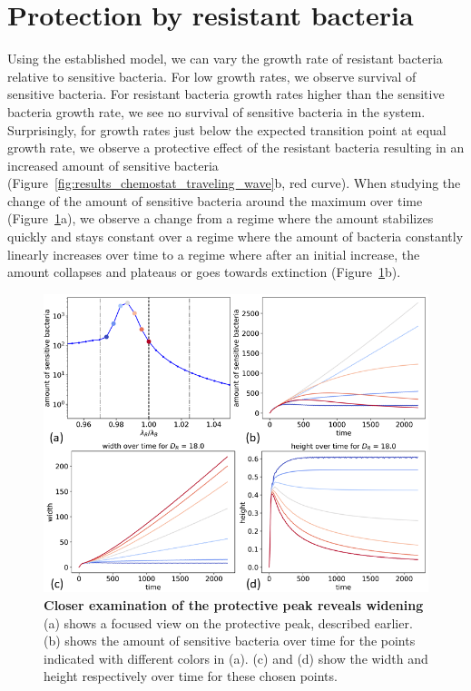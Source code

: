\section{Protection by resistant bacteria}
\label{sec:protective_effect}
Using the established model, we can vary the growth rate of resistant bacteria relative to sensitive bacteria. For low growth rates, we observe survival of sensitive bacteria. For resistant bacteria growth rates higher than the sensitive bacteria growth rate, we see no survival of sensitive bacteria in the system. Surprisingly, for growth rates just below the expected transition point at equal growth rate, we observe a protective effect of the resistant bacteria resulting in an increased amount of sensitive bacteria (Figure~\ref{fig:results_chemostat_traveling_wave}b, red curve). When studying the change of the amount of sensitive bacteria around the maximum over time (Figure~\ref{fig:results_peak_change_height_width}a), we observe a change from a regime where the amount stabilizes quickly and stays constant over a regime where the amount of bacteria constantly linearly increases over time to a regime where after an initial increase, the amount collapses and plateaus or goes towards extinction (Figure~\ref{fig:results_peak_change_height_width}b).

\begin{figure}
\centering
\includegraphics[width=\linewidth]{graphics/2025_09_26_droplets_fig3.png}
\caption{\textbf{Closer examination of the protective peak reveals widening} (a) shows a focused view on the protective peak, described earlier. (b) shows the amount of sensitive bacteria over time for the points indicated with different colors in (a). (c) and (d) show the width and height respectively over time for these chosen points.}
\label{fig:results_peak_change_height_width}
\end{figure}


